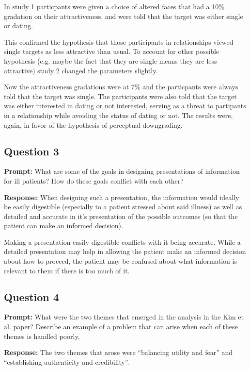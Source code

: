 \documentclass{article}
\begin{document}
In study 1 particpants were given a choice of altered faces that had a 10\% gradation on their attractiveness, and were told that the target was either single or dating.

This confirmed the hypothesis that those participants in relationships viewed single targets as less attractive than usual. To account for other possible hypothesis (e.g. maybe the fact that they are single means they are less attractive) study 2 changed the parameters slightly.

Now the attractiveness gradations were at 7\% and the particpants were always told that the target was single. The participants were also told that the target was either interested in dating or not interested, serving as a threat to partipants in a relationship while avoiding the status of dating or not. The results were, again, in favor of the hypothesis of perceptual downgrading.

\subsection*{Question 3}
\noindent\textbf{Prompt:} What are some of the goals in designing presentations of information for ill patients? How do these goals conflict with each other? 
\bigskip

\noindent\textbf{Response:} When designing such a presentation, the information would ideally be easily digestible (especially to a patient stressed about said illness) as well as detailed and accurate in it's presentation of the possible outcomes (so that the patient can make an informed decision).

Making a presentation easily digestible conflicts with it being accurate. While a detailed presentation may help in allowing the patient make an informed decision about how to proceed, the patient may be confused about what information is relevant to them if there is too much of it.

\subsection*{Question 4}
\noindent\textbf{Prompt:} What were the two themes that emerged in the analysis in the Kim et al. paper? Describe an example of a problem that can arise when each of these themes is handled poorly.
\bigskip

\noindent\textbf{Response:} The two themes that arose were ``balancing utility and fear'' and ``establishing authenticity and credibility''.
\end{document}
